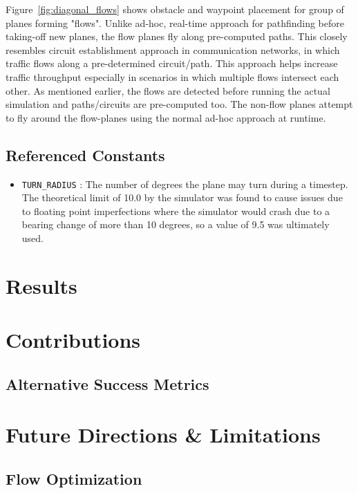 \documentclass[10pt]{article}
\newcommand{\ms}[1] {
  \texttt{#1}
}
\begin{document}
Figure~\ref{fig:diagonal_flows} shows obstacle and waypoint placement
for group of planes forming "flows". Unlike ad-hoc, real-time approach for
pathfinding before taking-off new planes, the flow planes fly along pre-computed
paths. This closely resembles circuit establishment approach in communication
networks, in which traffic flows along a pre-determined circuit/path. This
approach helps increase traffic throughput especially in scenarios in which
multiple flows intersect each other. As mentioned earlier, the flows are
detected before running the actual simulation and paths/circuits are
pre-computed too. The non-flow planes attempt to fly around the flow-planes
using the normal ad-hoc approach at runtime.



\subsection{Referenced Constants}
\begin{itemize}
  \item \ms{TURN\_RADIUS}: The number of degrees the plane may turn during a timestep. The theoretical limit of 
    10.0 by the simulator was found to cause issues due to floating point imperfections where the simulator would
    crash due to a bearing change of more than 10 degrees, so a value of 9.5 was ultimately used.
\end{itemize}


\newpage
\section{Results}

\newpage
\section{Contributions}

\subsection{Alternative Success Metrics}

\newpage
\section{Future Directions \& Limitations}

\subsection{Flow Optimization}
\end{document}
